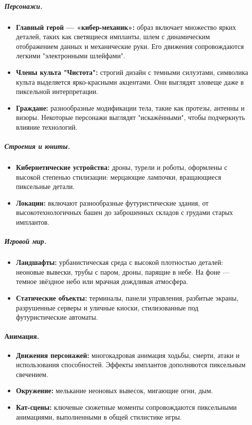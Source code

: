 \documentclass{article}
\begin{document}
\begin{itemize}
\subparagraph{Персонажи.}
\begin{itemize}
    \item \textbf{Главный герой — «кибер-механик»:} образ включает множество ярких деталей, таких как светящиеся импланты, шлем с динамическим отображением данных и механические руки. Его движения сопровождаются легкими "электронными шлейфами".
    \item \textbf{Члены культа "Чистота":} строгий дизайн с темными силуэтами, символика культа выделяется ярко-красными акцентами. Они выглядят зловеще даже в пиксельной интерпретации.
    \item \textbf{Граждане:} разнообразные модификации тела, такие как протезы, антенны и визоры. Некоторые персонажи выглядят "искажёнными", чтобы подчеркнуть влияние технологий.
\end{itemize}

\subparagraph{Строения и юниты.}
\begin{itemize}
    \item \textbf{Кибернетические устройства:} дроны, турели и роботы, оформлены с высокой степенью стилизации: мерцающие лампочки, вращающиеся пиксельные детали.
    \item \textbf{Локации:} включают разнообразные футуристические здания, от высокотехнологичных башен до заброшенных складов с грудами старых имплантов.
\end{itemize}

\subparagraph{Игровой мир.}
\begin{itemize}
    \item \textbf{Ландшафты:} урбанистическая среда с высокой плотностью деталей: неоновые вывески, трубы с паром, дроны, парящие в небе. На фоне — темное звёздное небо или мрачная дождливая атмосфера.
    \item \textbf{Статические объекты:} терминалы, панели управления, разбитые экраны, разрушенные серверы и уличные киоски, стилизованные под футуристические автоматы.
\end{itemize}

\paragraph{Анимация.}
\begin{itemize}
    \item \textbf{Движения персонажей:} многокадровая анимация ходьбы, смерти, атаки и использования способностей. Эффекты имплантов дополняются пиксельным свечением.
    \item \textbf{Окружение:} мелькание неоновых вывесок, мигающие огни, дым.
    \item \textbf{Кат-сцены:} ключевые сюжетные моменты сопровождаются пиксельными анимациями, выполненными в общей стилистике игры.
\end{itemize}


\end{itemize}
\end{document}
